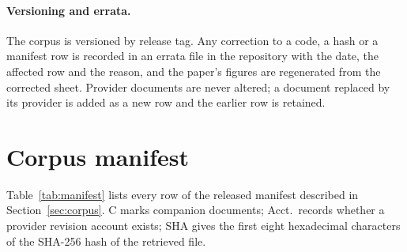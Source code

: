 \documentclass{article}
\begin{document}
\paragraph{Versioning and errata.} The corpus is versioned by release tag. Any correction to a code, a hash or a manifest row is recorded in an errata file in the repository with the date, the affected row and the reason, and the paper's figures are regenerated from the corrected sheet. Provider documents are never altered; a document replaced by its provider is added as a new row and the earlier row is retained.

\clearpage
\section{Corpus manifest}
\label{apx:manifest}
Table~\ref{tab:manifest} lists every row of the released manifest described in Section~\ref{sec:corpus}. C marks companion documents; Acct.\ records whether a provider revision account exists; SHA gives the first eight hexadecimal characters of the SHA-256 hash of the retrieved file.
\begin{table}[H]\centering\tiny
\caption{Corpus manifest.}
\label{tab:manifest}
\end{table}
\end{document}
